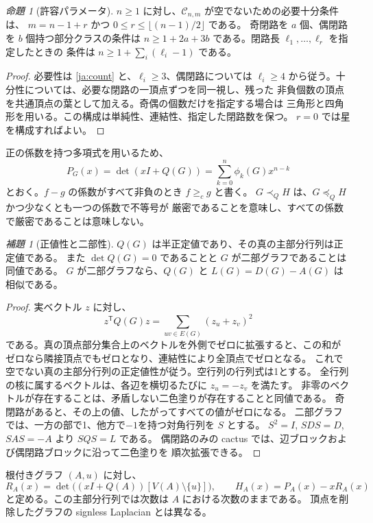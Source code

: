\documentclass[12pt]{amsart}
\theoremstyle{definition}
\theoremstyle{remark}
\numberwithin{equation}{section}
\newtheorem{jprop}[thm]{命題}
\newtheorem{jlem}[thm]{補題}
\begin{document}
\begin{jprop}[許容パラメータ]\label{ja:range}
$n\ge1$ に対し、$\mathcal C_{n,m}$ が空でないための必要十分条件は、
$m=n-1+r$ かつ $0\le r\le\lfloor(n-1)/2\rfloor$ である。
奇閉路を $a$ 個、偶閉路を $b$ 個持つ部分クラスの条件は
$n\ge1+2a+3b$ である。閉路長 $\ell_1,\ldots,\ell_r$ を指定したときの
条件は $n\ge1+\sum_i(\ell_i-1)$ である。
\end{jprop}
\begin{proof}
必要性は \eqref{ja:count} と、$\ell_i\ge3$、偶閉路については $\ell_i\ge4$
から従う。十分性については、必要な閉路の一頂点ずつを同一視し、残った
非負個数の頂点を共通頂点の葉として加える。奇偶の個数だけを指定する場合は
三角形と四角形を用いる。この構成は単純性、連結性、指定した閉路数を保つ。
$r=0$ では星を構成すればよい。
\end{proof}

正の係数を持つ多項式を用いるため、
\begin{equation}\label{ja:P}
 P_G(x)=\det(xI+Q(G))=\sum_{k=0}^n\phi_k(G)x^{n-k}
\end{equation}
とおく。$f-g$ の係数がすべて非負のとき $f\ge_c g$ と書く。
$G\prec_Q H$ は、$G\preceq_Q H$ かつ少なくとも一つの係数で不等号が
厳密であることを意味し、すべての係数で厳密であることは意味しない。

\begin{jlem}[正値性と二部性]\label{ja:positive}
$Q(G)$ は半正定値であり、その真の主部分行列は正定値である。
また $\det Q(G)=0$ であることと $G$ が二部グラフであることは同値である。
$G$ が二部グラフなら、$Q(G)$ と $L(G)=D(G)-A(G)$ は相似である。
\end{jlem}
\begin{proof}
実ベクトル $z$ に対し、
\[
 z^{\mathsf T}Q(G)z=\sum_{uv\in E(G)}(z_u+z_v)^2
\]
である。真の頂点部分集合上のベクトルを外側でゼロに拡張すると、この和が
ゼロなら隣接頂点でもゼロとなり、連結性により全頂点でゼロとなる。
これで空でない真の主部分行列の正定値性が従う。空行列の行列式は1とする。
全行列の核に属するベクトルは、各辺を横切るたびに $z_u=-z_v$ を満たす。
非零のベクトルが存在することは、矛盾しない二色塗りが存在することと同値である。
奇閉路があると、その上の値、したがってすべての値がゼロになる。
二部グラフでは、一方の部で1、他方で$-1$を持つ対角行列を $S$ とする。
$S^2=I$, $SDS=D$, $SAS=-A$ より $SQS=L$ である。
偶閉路のみの cactus では、辺ブロックおよび偶閉路ブロックに沿って二色塗りを
順次拡張できる。
\end{proof}

根付きグラフ $(A,u)$ に対し、
\begin{equation}\label{ja:RH}
 R_A(x)=\det\bigl((xI+Q(A))[V(A)\setminus\{u\}]\bigr),\qquad
 H_A(x)=P_A(x)-xR_A(x)
\end{equation}
と定める。この主部分行列では次数は $A$ における次数のままである。
頂点を削除したグラフの signless Laplacian とは異なる。
\end{document}
